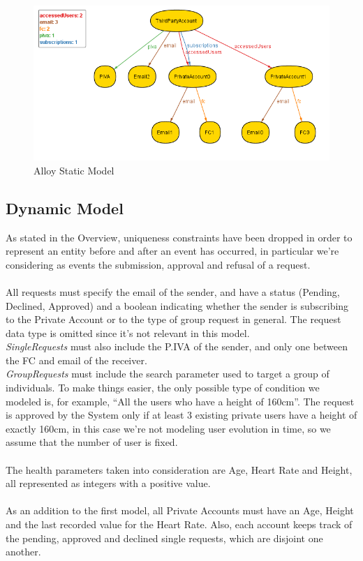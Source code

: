\documentclass[titlepage]{article}
\begin{document}
		\begin{figure}[ht]
			\center
  			\includegraphics[width=\textwidth]{Alloy/staticModel.png}
  			\caption{Alloy Static Model}
 			\label{fig:staticModel}
		\end{figure}
	
		\subsection{Dynamic Model}
		As stated in the Overview, uniqueness constraints have been dropped in order to represent an entity before and 		after an event has occurred, in particular we’re considering as events the submission, approval and refusal of a 		request.\\
		\\
		All requests must specify the email of the sender, and have a status (Pending, Declined, Approved) and a boolean 		indicating whether the sender is subscribing to the Private Account or to the type of group request in general. The 		request data type is omitted since it’s not relevant in this model.\\
		{\it SingleRequests} must also include the P.IVA of the sender, and only one between the FC and email of the 			receiver.\\
		{\it GroupRequests} must include the search parameter used to target a group of individuals. To make things easier, 		the only possible type of condition we modeled is, for example, “All the users who have a height of 160cm”. The 		request is approved by the System only if at least 3 existing private users have a height of exactly 160cm, in this 		case we’re not modeling user evolution in time, so we assume that the number of user is fixed.\\
		\\
		The health parameters taken into consideration are Age, Heart Rate and Height, all represented as integers with a 		positive value.\\
		\\
		As an addition to the first model, all Private Accounts must have an Age, Height and the last recorded value for the 		Heart Rate. Also, each account keeps track of the pending, approved and declined single requests, which are 			disjoint one another.\\	
\end{document}
